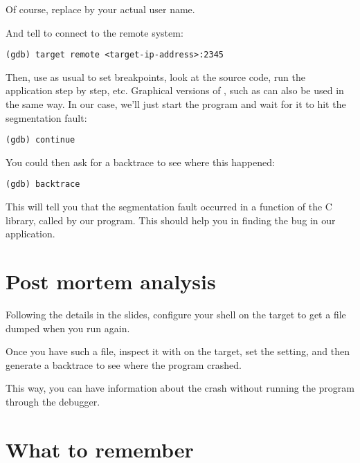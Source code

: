 Of course, replace  by your actual user name.

And tell  to connect to the remote system:
\begin{verbatim}
(gdb) target remote <target-ip-address>:2345
\end{verbatim}

Then, use  as usual to set breakpoints, look at the source
code, run the application step by step, etc. Graphical versions of
, such as  can also be used in the same way.
In our case, we'll just start the program and wait for it to hit
the segmentation fault:
\begin{verbatim}
(gdb) continue
\end{verbatim}

You could then ask for a backtrace to see where this happened:
\begin{verbatim}
(gdb) backtrace
\end{verbatim}

This will tell you that the segmentation fault occurred in a function
of the C library, called by our program. This should help you in
finding the bug in our application.

\section{Post mortem analysis}

Following the details in the slides, configure your shell on the
target to get a  file dumped when you run 
again.

Once you have such a file, inspect it with  on
the target, set the  setting, and then generate
a backtrace to see where the program crashed.

This way, you can have information about the crash without
running the program through the debugger.

\section{What to remember}

